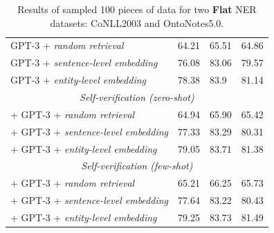 \documentclass[11pt]{article}
\begin{document}
\begin{table}[th!]
{\begin{tabular}{llll}
        GPT-3 + \textit{random retrieval} & 64.21 & 65.51 & 64.86 \\
        GPT-3 + \textit{sentence-level embedding} & 76.08 & 83.06 & 79.57 \\
        GPT-3 + \textit{entity-level embedding} & 78.38 & 83.9 & 81.14 \\\midrule
        \multicolumn{4}{c}{{\it Self-verification (zero-shot)}} \\\midrule
        + GPT-3 + \textit{random retrieval} & 64.94 & 65.90 & 65.42 \\
        + GPT-3 + \textit{sentence-level embedding} & 77.33 & 83.29 & 80.31 \\
        + GPT-3 + \textit{entity-level embedding} & 79.05 & 83.71 & 81.38 \\\midrule
        \multicolumn{4}{c}{{\it Self-verification (few-shot)}} \\\midrule
        + GPT-3 + \textit{random retrieval} & 65.21 & 66.25 & 65.73 \\
        + GPT-3 + \textit{sentence-level embedding} & 77.64 & 83.22 & 80.43 \\
        + GPT-3 + \textit{entity-level embedding} & 79.25 & 83.73 & 81.49 \\\bottomrule
    \end{tabular}
    }
     \caption{Results of sampled 100 pieces of data for two \textbf{Flat} NER datasets: CoNLL2003 and OntoNotes5.0.}
    \label{tab:sample_ner_result}
\end{table}
\end{document}
